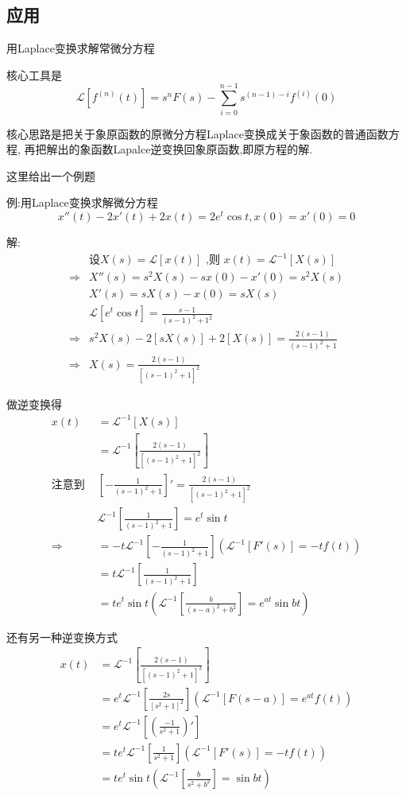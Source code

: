 \documentclass[12pt, a4paper, oneside]{ctexart}
\begin{document}
\subsection{应用}
用Laplace变换求解常微分方程

核心工具是
\[
    \mathcal{L}\left[f^{(n)}(t)\right] = s^nF(s) - \sum_{i=0}^{n-1}s^{(n-1)-i}f^{(i)}(0)
\]

核心思路是把关于象原函数的原微分方程Laplace变换成关于象函数的普通函数方程,
再把解出的象函数Lapalce逆变换回象原函数,即原方程的解.

这里给出一个例题

例:用Laplace变换求解微分方程
\[
    x''(t) - 2x'(t) + 2x(t) = 2e^{t}\cos t,x(0) = x'(0) = 0
\]

解:
\begin{align*}
    &\text{设}X(s) = \mathcal{L}[x(t)]\text{ ,则 }x(t)=\mathcal{L}^{-1}[X(s)]\\
    \Rightarrow & X''(s) = s^2X(s) - sx(0) - x'(0) = s^2X(s)\\
    & X'(s) = sX(s) - x(0) = sX(s)\\
    & \mathcal{L}[e^t\cos t] = \frac{s-1}{(s-1)^2+1^2}\\
    \Rightarrow & s^2X(s) - 2[sX(s)] + 2[X(s)] = \frac{2(s-1)}{(s-1)^2+1}\\
    \Rightarrow & X(s) = \frac{2(s-1)}{\left[(s-1)^2+1\right]^2}
\end{align*}

做逆变换得
\begin{align*}
    x(t) &= \mathcal{L}^{-1}[X(s)]\\
    &= \mathcal{L}^{-1}\left[\frac{2(s-1)}{\left[(s-1)^2+1\right]^2}\right]\\
    \text{注意到 }&\left[-\frac{1}{(s-1)^2+1}\right]' = \frac{2(s-1)}{\left[(s-1)^2+1\right]^2}\\
    & \mathcal{L}^{-1}[\frac{1}{(s-1)^2+1}] = e^t\sin t\\
    \Rightarrow &= -t\mathcal{L}^{-1}[-\frac{1}{(s-1)^2+1}](\mathcal{L}^{-1}\left[F'(s)\right]=-tf(t))\\
    &= t\mathcal{L}^{-1}[\frac{1}{(s-1)^2+1}]\\
    &= te^t\sin t(\mathcal{L}^{-1}[\frac{b}{(s-a)^2+b^2}]=e^{at}\sin bt)
\end{align*}

还有另一种逆变换方式
\begin{align*}
    x(t) &= \mathcal{L}^{-1}\left[\frac{2(s-1)}{\left[(s-1)^2+1\right]^2}\right]\\
    &= e^t\mathcal{L}^{-1}\left[\frac{2s}{[s^2+1]^2}\right](\mathcal{L}^{-1}\left[F(s-a)\right]=e^{at}f(t))\\
    &= e^t\mathcal{L}^{-1}\left[(\frac{-1}{s^2+1})'\right]\\
    &= te^t\mathcal{L}^{-1}\left[\frac{1}{s^2+1}\right](\mathcal{L}^{-1}\left[F'(s)\right]=-tf(t))\\
    &= te^t\sin t(\mathcal{L}^{-1}[\frac{b}{s^2+b^2}]=\sin bt)
\end{align*}
\end{document}
